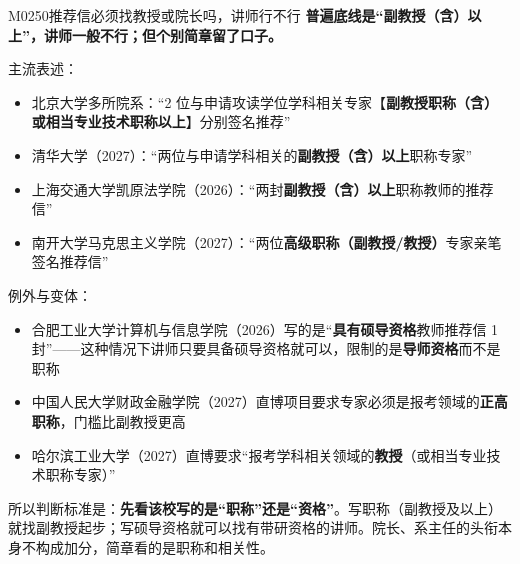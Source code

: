 \begin{qa}{M0250}{推荐信必须找教授或院长吗，讲师行不行}
\textbf{普遍底线是“副教授（含）以上”，讲师一般不行；但个别简章留了口子。}

主流表述：

\begin{itemize}
  \item 北京大学多所院系：“2 位与申请攻读学位学科相关专家【\textbf{副教授职称（含）或相当专业技术职称以上}】分别签名推荐”
  \item 清华大学（2027）：“两位与申请学科相关的\textbf{副教授（含）以上}职称专家”
  \item 上海交通大学凯原法学院（2026）：“两封\textbf{副教授（含）以上}职称教师的推荐信”
  \item 南开大学马克思主义学院（2027）：“两位\textbf{高级职称（副教授/教授）}专家亲笔签名推荐信”
\end{itemize}

例外与变体：

\begin{itemize}
  \item 合肥工业大学计算机与信息学院（2026）写的是“\textbf{具有硕导资格}教师推荐信 1 封”——这种情况下讲师只要具备硕导资格就可以，限制的是\textbf{导师资格}而不是职称
  \item 中国人民大学财政金融学院（2027）直博项目要求专家必须是报考领域的\textbf{正高职称}，门槛比副教授更高
  \item 哈尔滨工业大学（2027）直博要求“报考学科相关领域的\textbf{教授}（或相当专业技术职称专家）”
\end{itemize}

所以判断标准是：\textbf{先看该校写的是“职称”还是“资格”}。写职称（副教授及以上）就找副教授起步；写硕导资格就可以找有带研资格的讲师。院长、系主任的头衔本身不构成加分，简章看的是职称和相关性。
\end{qa}

